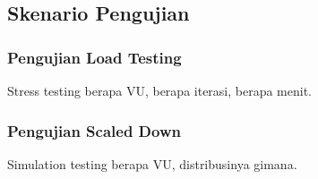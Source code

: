 \subsection{Skenario Pengujian}

\subsubsection{Pengujian Load Testing}

Stress testing berapa VU, berapa iterasi, berapa menit.

\subsubsection{Pengujian Scaled Down}

Simulation testing berapa VU, distribusinya gimana.
